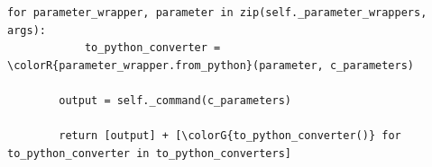 \begin{frame}[fragile]
{\begin{center}
\begin{minipage}{.8\linewidth}
\begin{Verbatim}[commandchars=\\\{\}]
        for parameter_wrapper, parameter in zip(self._parameter_wrappers, args):
            to_python_converter = \colorR{parameter_wrapper.from_python}(parameter, c_parameters)

        output = self._command(c_parameters)

        return [output] + [\colorG{to_python_converter()} for to_python_converter in to_python_converters]
\end{Verbatim}
    \end{minipage}
  \end{center}}
  \note{
    \begin{enumerate}
    \item 
    \end{enumerate}
  }
\end{frame}

